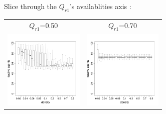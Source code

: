 \documentclass[8pt, handout=show,notes=show]{beamer}
\begin{document}
\begin{frame}{ Slice through the $Q_{r1}$'s availablities axis : }

	\renewcommand{\imgSize}{3.8cm}	
	\begin{table}[H]

		\centering
		\begin{tabular}{cc}
			$Q_{r1}$=0.50&$Q_{r1}$=0.70\\
			\includegraphics[width=\imgSize]{images/alive_density_r1-50.png}&
			\includegraphics[width=\imgSize]{images/alive_density_r1-70.png}\\

\end{tabular}
\end{table}
\end{frame}
\end{document}
